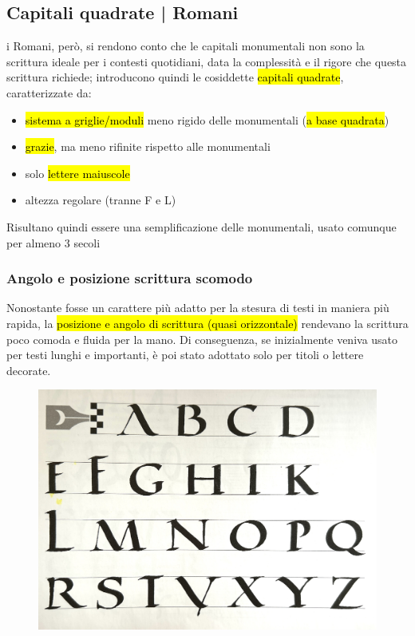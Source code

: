 \subsection{Capitali quadrate | Romani}
i Romani, però, si rendono conto che le capitali monumentali non sono la scrittura ideale per i contesti quotidiani, data la complessità e il rigore che questa scrittura richiede; introducono quindi le cosiddette \hl{capitali quadrate}, caratterizzate da:
\begin{itemize}
    \item \hl{sistema a griglie/moduli} meno rigido delle monumentali (\hl{a base quadrata})
    \item \hl{grazie}, ma meno rifinite rispetto alle monumentali
    \item solo \hl{lettere maiuscole}
    \item altezza regolare (tranne F e L)
\end{itemize}
Risultano quindi essere una semplificazione delle monumentali, usato comunque per almeno 3 secoli
\subsubsection{Angolo e posizione scrittura scomodo}
Nonostante fosse un carattere più adatto per la stesura di testi in maniera più rapida, la \hl{posizione e angolo di scrittura (quasi orizzontale) } rendevano la scrittura poco comoda e fluida per la mano. Di conseguenza, se inizialmente veniva usato per testi lunghi e importanti, è poi stato adottato solo per titoli o lettere decorate.
\begin{figure}[H]
    \centering
    \includegraphics[width=0.3\linewidth]{lezione_3/imgs/cap_quadrata.jpg}
\end{figure}

